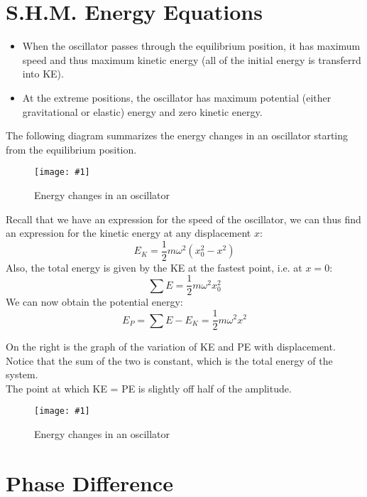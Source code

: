 \documentclass[a4paper,12pt]{article}
\let\oldsection\section
\renewcommand\section{\clearpage\oldsection}
\newcommand{\lb}{\\[8pt]}
\newcommand{\img}[4]{\begin{center}
  \begin{figure}[H]
    \centering
    \texttt{[image: \#1]}
    \caption{#3}
    \label{fig:#4}
  \end{figure}
\end{center}}
\newcommand{\paren}[1]{\left(#1\right)}
\begin{document}
\section{S.H.M. Energy Equations}

\begin{itemize}
  \item When the oscillator passes through the equilibrium position, it has maximum speed and thus maximum kinetic energy (all of the initial energy is transferrd into KE).
  \item At the extreme positions, the oscillator has maximum potential (either gravitational or elastic) energy and zero kinetic energy.
\end{itemize}

The following diagram summarizes the energy changes in an oscillator starting from the equilibrium position.
\img{energy1.png}{0.7}{Energy changes in an oscillator}{energy}
Recall that we have an expression for the speed of the oscillator, we can thus find an expression for the kinetic energy at any displacement $x$:
\begin{equation}
  E_K = \frac{1}{2}m\omega^2\paren{x_0^2 - x^2}
\end{equation}
Also, the total energy is given by the KE at the fastest point, i.e. at $x = 0$:
\begin{equation}
  \sum E = \frac{1}{2}m\omega^2x_0^2
\end{equation}
We can now obtain the potential energy:
\begin{equation}
  E_P = \sum E - E_K = \frac{1}{2}m\omega^2x^2
\end{equation}

\begin{minipage}[t]{0.5\textwidth}
  On the right is the graph of the variation of KE and PE with displacement. Notice that the sum of the two is constant, which is the total energy of the system.\lb
  The point at which KE = PE is slightly off half of the amplitude.
\end{minipage}\hspace*{0.1\textwidth}%
\begin{minipage}[t]{0.4\textwidth}
  \img{rel.png}{1}{Energy changes in an oscillator}{rel}
\end{minipage}


\section{Phase Difference}
\end{document}
